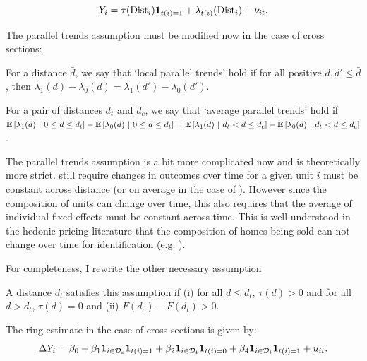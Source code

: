 \documentclass[10pt]{article}
\newcommand{\dist}{\text{Dist}}
\begin{document}
\begin{equation}\label{eq:model_rc}
    Y_{i} = \tau(\dist_i) \one_{t(i) = 1} + \lambda_{t(i)}(\dist_i) + \nu_{it}.  
\end{equation}

The parallel trends assumption must be modified now in the case of cross sections:

\begin{assumption}\label{assum:parallel_rc}
    For a distance $\bar{d}$, we say that `local parallel trends' hold if for all positive $d, d' \leq \bar{d}$, then $\lambda_1(d) - \lambda_0(d) = \lambda_1(d') - \lambda_0(d')$.
\end{assumption}

\begin{assumption}\label{assum:parallel_weak_rc}
    For a pair of distances $d_t$ and $d_c$, we say that `average parallel trends' hold if $\mathbb{E}\left[\lambda_1(d) \ \vert \ 0 \leq d \leq d_t\right] - \mathbb{E}\left[\lambda_0(d) \ \vert \ 0 \leq d \leq d_t\right] = \mathbb{E}\left[\lambda_1(d) \ \vert \ d_t < d \leq d_c\right] - \mathbb{E}\left[\lambda_0(d) \ \vert \ d_t < d \leq d_c\right]$.
\end{assumption}

The parallel trends assumption is a bit more complicated now and is theoretically more strict.  still require changes in outcomes over time for a given unit $i$ must be constant across distance (or on average in the case of ). However since the composition of units can change over time, this also requires that the average of individual fixed effects must be constant across time. This is well understood in the hedonic pricing literature that the composition of homes being sold can not change over time for identification (e.g. \citet{Linden_Rockoff_2008}).

For completeness, I rewrite the other necessary assumption
\begin{assumption}[Correct $d_t$]\label{assum:dt}
    A distance $d_t$ satisfies this assumption if (i) for all $d \leq d_t$, $\tau(d) > 0$ and for all $d > d_t$, $\tau(d) = 0$ and (ii) $F(d_c) - F(d_t) > 0$.
\end{assumption}

The ring estimate in the case of cross-sections is given by:
\begin{equation}\label{eq:ring_method}
    \Delta Y_{i} = \beta_0 + \beta_1 \mathbf{1}_{i \in \mathcal{D}_c} \mathbf{1}_{t(i) = 1} + \beta_2 \mathbf{1}_{i \in \mathcal{D}_t} \mathbf{1}_{t(i) = 0} + \beta_4 \mathbf{1}_{i \in \mathcal{D}_t} \mathbf{1}_{t(i) = 1} + u_{it}.
\end{equation}
\end{document}
